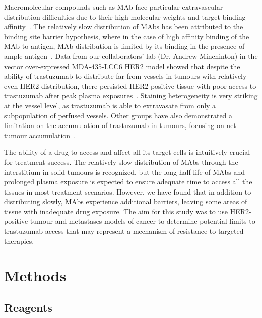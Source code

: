 Macromolecular compounds such as \acs{MAb} face particular extravascular distribution difficulties due to their high molecular weights and target-binding affinity~\cite{Jain:2010ie,Chauhan:2011fi}.
The relatively slow distribution of \acs{MAb}s has been attributed to the binding site barrier hypothesis, where in the case of high affinity binding of the \acs{MAb} to antigen, \acs{MAb} distribution is limited by its binding in the presence of ample antigen~\cite{Juweid:1992ty}.
Data from our collaborators' lab (Dr. Andrew Minchinton) in the vector over-expressed MDA-435-LCC6 \acs{HER2} model showed that despite the ability of trastuzumab to distribute far from vessels in tumours with relatively even \acs{HER2} distribution, there persisted \acs{HER2}-positive tissue with poor access to trastuzumab after peak plasma exposures~\cite{Baker:2008ci}.
Staining heterogeneity is very striking at the vessel level, as trastuzumab is able to extravasate from only a subpopulation of perfused vessels.
Other groups have also demonstrated a limitation on the accumulation of trastuzumab in tumours, focusing on net tumour accumulation~\cite{Jain:2010ie,Chauhan:2011fi,Lee:2010gb}.

The ability of a drug to access and affect all its target cells is intuitively crucial for treatment success.
The relatively slow distribution of \acs{MAb}s through the interstitium in solid tumours is recognized, but the long half-life of \acs{MAb}s and prolonged plasma exposure is expected to ensure adequate time to access all the tissues in most treatment scenarios.
However, we have found that in addition to distributing slowly, \acs{MAb}s experience additional barriers, leaving some areas of tissue with inadequate drug exposure.
The aim for this study was to use \acs{HER2}-positive tumour and metastases models of cancer to determine potential limits to trastuzumab access that may represent a mechanism of resistance to targeted therapies.

\section{Methods}

\subsection{Reagents}

